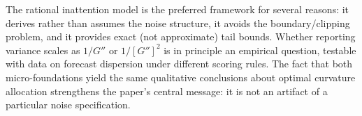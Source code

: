 \documentclass[11pt]{article}
\begin{document}
The rational inattention model is the preferred framework for several reasons: it derives rather than assumes the noise structure, it avoids the boundary/clipping problem, and it provides exact (not approximate) tail bounds. Whether reporting variance scales as $1/G''$ or $1/[G'']^2$ is in principle an empirical question, testable with data on forecast dispersion under different scoring rules. The fact that both micro-foundations yield the same qualitative conclusions about optimal curvature allocation strengthens the paper's central message: it is not an artifact of a particular noise specification.
\end{document}

